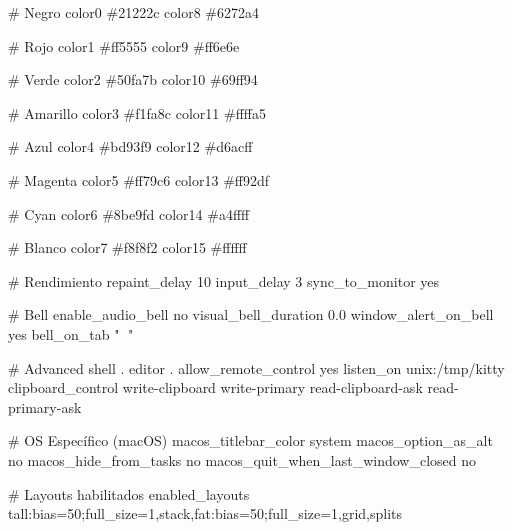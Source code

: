 \documentclass[
  doc,
  floatsintext,
  longtable,
  a4paper,
  nolmodern,
  notxfonts,
  notimes,
  12pt,
  colorlinks=true,linkcolor=blue,citecolor=blue,urlcolor=blue]{apa7}
\newenvironment{Shaded}{\begin{snugshade}}{\end{snugshade}}
\newcommand{\CommentTok}[1]{\textcolor[rgb]{0.37,0.37,0.37}{#1}}
\newcommand{\DataTypeTok}[1]{\textcolor[rgb]{0.68,0.00,0.00}{#1}}
\newcommand{\DecValTok}[1]{\textcolor[rgb]{0.68,0.00,0.00}{#1}}
\newcommand{\ErrorTok}[1]{\textcolor[rgb]{0.68,0.00,0.00}{#1}}
\newcommand{\OperatorTok}[1]{\textcolor[rgb]{0.37,0.37,0.37}{#1}}
\begin{document}
\begin{Shaded}
\begin{Highlighting}[]
\CommentTok{\# Negro}
\DataTypeTok{color0}  \CommentTok{\#21222c}
\DataTypeTok{color8}  \CommentTok{\#6272a4}

\CommentTok{\# Rojo}
\DataTypeTok{color1}  \CommentTok{\#ff5555}
\DataTypeTok{color9}  \CommentTok{\#ff6e6e}

\CommentTok{\# Verde}
\DataTypeTok{color2}  \CommentTok{\#50fa7b}
\DataTypeTok{color10} \CommentTok{\#69ff94}

\CommentTok{\# Amarillo}
\DataTypeTok{color3}  \CommentTok{\#f1fa8c}
\DataTypeTok{color11} \CommentTok{\#ffffa5}

\CommentTok{\# Azul}
\DataTypeTok{color4}  \CommentTok{\#bd93f9}
\DataTypeTok{color12} \CommentTok{\#d6acff}

\CommentTok{\# Magenta}
\DataTypeTok{color5}  \CommentTok{\#ff79c6}
\DataTypeTok{color13} \CommentTok{\#ff92df}

\CommentTok{\# Cyan}
\DataTypeTok{color6}  \CommentTok{\#8be9fd}
\DataTypeTok{color14} \CommentTok{\#a4ffff}

\CommentTok{\# Blanco}
\DataTypeTok{color7}  \CommentTok{\#f8f8f2}
\DataTypeTok{color15} \CommentTok{\#ffffff}

\CommentTok{\# Rendimiento}
\DataTypeTok{repaint\_delay} \DataTypeTok{10}
\DataTypeTok{input\_delay} \DataTypeTok{3}
\DataTypeTok{sync\_to\_monitor} \DataTypeTok{yes}

\CommentTok{\# Bell}
\DataTypeTok{enable\_audio\_bell} \DataTypeTok{no}
\DataTypeTok{visual\_bell\_duration} \DataTypeTok{0.0}
\DataTypeTok{window\_alert\_on\_bell} \DataTypeTok{yes}
\DataTypeTok{bell\_on\_tab} \DataTypeTok{"🔔 "}

\CommentTok{\# Advanced}
\DataTypeTok{shell} \DataTypeTok{.}
\DataTypeTok{editor} \DataTypeTok{.}
\DataTypeTok{allow\_remote\_control} \DataTypeTok{yes}
\DataTypeTok{listen\_on} \DataTypeTok{unix}\ErrorTok{:/}\DataTypeTok{tmp}\ErrorTok{/}\DataTypeTok{kitty}
\DataTypeTok{clipboard\_control} \DataTypeTok{write{-}clipboard} \DataTypeTok{write{-}primary} \DataTypeTok{read{-}clipboard{-}ask} \DataTypeTok{read{-}primary{-}ask}

\CommentTok{\# OS Específico (macOS)}
\DataTypeTok{macos\_titlebar\_color} \DataTypeTok{system}
\DataTypeTok{macos\_option\_as\_alt} \DataTypeTok{no}
\DataTypeTok{macos\_hide\_from\_tasks} \DataTypeTok{no}
\DataTypeTok{macos\_quit\_when\_last\_window\_closed} \DataTypeTok{no}

\CommentTok{\# Layouts habilitados}
\DataTypeTok{enabled\_layouts} \DataTypeTok{tall}\ErrorTok{:}\DataTypeTok{bias}\OperatorTok{=}\DecValTok{50}\ErrorTok{;}\DataTypeTok{full\_size}\OperatorTok{=}\DecValTok{1}\ErrorTok{,}\DataTypeTok{stack}\ErrorTok{,}\DataTypeTok{fat}\ErrorTok{:}\DataTypeTok{bias}\OperatorTok{=}\DecValTok{50}\ErrorTok{;}\DataTypeTok{full\_size}\OperatorTok{=}\DecValTok{1}\ErrorTok{,}\DataTypeTok{grid}\ErrorTok{,}\DataTypeTok{splits}


\end{Highlighting}
\end{Shaded}
\end{document}
